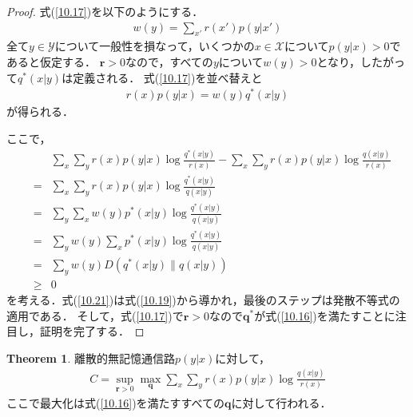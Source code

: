 \documentclass{ltjsarticle}
\theoremstyle{definition}
\newtheorem{thm}[dfn]{Theorem}
\begin{document}
\begin{proof}
  式(\ref{10.17})を以下のようにする．
  \begin{eqnarray}
    \label{10.18}
    w(y) = \sum_{x'}r(x')p(y|x')
  \end{eqnarray}
  全て$y \in \mathcal{Y}$について一般性を損なって，いくつかの$x \in \mathcal{X}$について$p(y|x) > 0$であると仮定する．
  $\mathbf{r} > 0$なので，すべての$y$について$w(y) > 0$となり，したがって$q^*(x|y)$は定義される．
  式(\ref{10.17})を並べ替えと
  \begin{eqnarray}
    \label{10.19}
    r(x)p(y|x) = w(y)q^*(x|y)
  \end{eqnarray}
  が得られる．

  ここで，
  \begin{eqnarray}
    && \sum_{x} \sum_{y} r(x)p(y|x) \log \frac{q^*(x|y)}{r(x)} - \sum_{x} \sum_{y} r(x)p(y|x) \log \frac{q(x|y)}{r(x)} \nonumber \\
    \label{10.20}
    &=& \sum_{x} \sum_{y} r(x) p(y|x)\log \frac{q^*(x|y)}{q(x|y)} \\
    \label{10.21}
    &=& \sum_{y} \sum_{x} w(y) p^*(x|y)\log \frac{q^*(x|y)}{q(x|y)} \\
    \label{10.22}
    &=& \sum_{y} w(y) \sum_{x}  p^*(x|y)\log \frac{q^*(x|y)}{q(x|y)} \\
    \label{10.23}
    &=& \sum_{y} w(y) D \left(  q^*(x|y) \parallel q(x|y) \right) \\
    \label{10.24}
    &\geq& 0
  \end{eqnarray}
  を考える．式(\ref{10.21})は式(\ref{10.19})から導かれ，最後のステップは発散不等式の適用である．
  そして，式(\ref{10.17})で$\mathbf{r}>0$なので$\mathbf{q}^*$が式(\ref{10.16})を満たすことに注目し，証明を完了する．
\end{proof}

\begin{thm}
  \label{theorem10.2}
  離散的無記憶通信路$p(y|x)$に対して，
  \begin{eqnarray}
    \label{10.25}
    C = \sup_{\mathbf{r}>0} \max_{\mathbf{q}} \sum_{x} \sum_{y} r(x) p(y|x) \log \frac{q(x|y)}{r(x)}
  \end{eqnarray}
  ここで最大化は式(\ref{10.16})を満たすすべての$\mathbf{q}$に対して行われる．
\end{thm}
\end{document}
